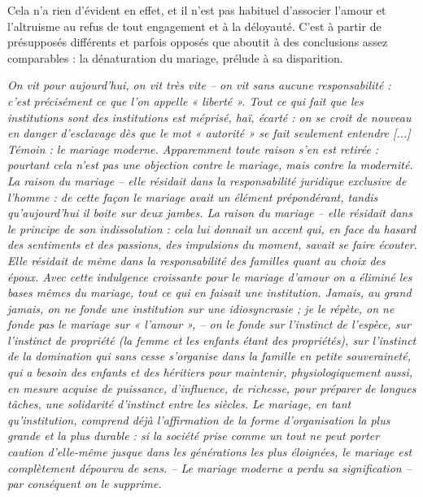 Cela n'a rien d'évident en effet, et il n'est pas habituel d'associer l'amour et l'altruisme au refus de tout engagement et à la déloyauté. 
C'est à partir de présupposés différents et parfois opposés que  aboutit à des conclusions assez comparables : la dénaturation du mariage, prélude à sa disparition.

\begin{displayquote}
%
\emph{On vit pour aujourd'hui, on vit très vite -- on vit sans aucune responsabilité : c'est précisément ce que l'on appelle « liberté ». Tout ce qui fait que les institutions sont des institutions est méprisé, haï, écarté : on se croit de nouveau en danger d'esclavage dès que le mot « autorité » se fait seulement entendre \emph{[...]} Témoin : \emph{le mariage moderne}. Apparemment toute raison s'en est retirée : pourtant cela n'est pas une objection contre le mariage, mais contre la modernité. La raison du mariage -- elle résidait dans la responsabilité juridique exclusive de l'homme : de cette façon le mariage avait un élément prépondérant, tandis qu'aujourd'hui il boite sur deux jambes. La raison du mariage -- elle résidait dans le principe de son indissolution : cela lui donnait un accent qui, en face du hasard des sentiments et des passions, des impulsions du moment, \emph{savait se faire écouter}. Elle résidait de même dans la responsabilité des familles quant au choix des époux. Avec cette indulgence croissante pour le mariage \emph{d'amour} on a éliminé les bases mêmes du mariage, tout ce qui en faisait une institution. Jamais, au grand jamais, on ne fonde une institution sur une idiosyncrasie ; je le répète, on ne fonde pas le mariage sur « l'amour », -- on le fonde sur l'instinct de l'espèce, sur l'instinct de propriété (la femme et les enfants étant des propriétés), sur \emph{l'instinct de la domination} qui sans cesse s'organise dans la famille en petite souveraineté, qui a \emph{besoin} des enfants et des héritiers pour maintenir, physiologiquement aussi, en mesure acquise de puissance, d'influence, de richesse, pour préparer de longues tâches, une solidarité d'instinct entre les siècles. Le mariage, en tant qu'institution, comprend déjà l'affirmation de la forme d'organisation la plus grande et la plus durable : si la société prise comme un tout ne peut \emph{porter caution} d'elle-même jusque dans les générations les plus éloignées, le mariage est complètement dépourvu de sens. -- Le mariage moderne a perdu sa signification -- par conséquent on le supprime.}  
%
\end{displayquote}



